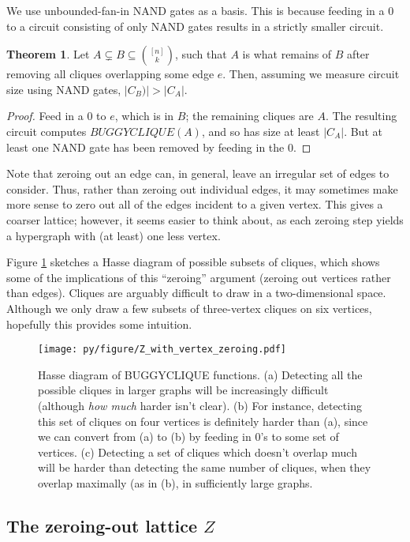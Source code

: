 \documentclass[12pt]{article}
\theoremstyle{definition}
\newtheorem{thm}{Theorem}[section]
\begin{document}
We use unbounded-fan-in NAND gates as a basis.
This is because feeding in a 0 to a circuit consisting of only NAND
gates results in a strictly smaller circuit.

\begin{thm}
\label{edgeZonking}
Let $A \subsetneq B \subseteq {[n] \choose k}$, such that $A$ is what remains
of $B$ after removing all cliques overlapping some edge $e$.
Then, assuming we measure circuit size using NAND gates,
$|C_B)| > |C_A|$.
\end{thm}
\begin{proof}
Feed in a 0 to $e$, which is in $B$; the remaining cliques are $A$.
The resulting
circuit computes $BUGGYCLIQUE(A)$, and so has size
at least $|C_A|$. But at least one
NAND gate has been removed by feeding in the 0.
\end{proof}

Note that zeroing out an edge can, in general, leave an irregular
set of edges to consider.
Thus, rather than zeroing out individual edges,
it may sometimes make more sense to zero out all of the
edges incident to a given vertex. This gives a coarser lattice; however,
it seems
easier to think about, as each zeroing step yields a hypergraph
with (at least) one less vertex.

Figure \ref{fig:Hasse}
sketches a Hasse diagram of possible subsets of cliques,
which shows some of the implications of this ``zeroing'' argument
(zeroing out vertices rather than edges).
Cliques are arguably difficult to draw in a two-dimensional space.
Although we only draw a few subsets of three-vertex cliques
on six vertices, hopefully this provides some
intuition.

\begin{figure}
\label{fig:Hasse}
\centering
\texttt{[image: py/figure/Z\_with\_vertex\_zeroing.pdf]}
\caption{Hasse diagram of BUGGYCLIQUE functions.
(a)
Detecting all the possible cliques in larger graphs will be
increasingly difficult (although {\em how much} harder isn't clear).
(b) For instance,
detecting this set of cliques on four vertices
is definitely harder than (a),
since we can convert from (a) to (b) by feeding in 0's to
some set of vertices.
(c) Detecting a set of cliques which doesn't overlap much will be
harder than detecting the same number of cliques, when they overlap
maximally (as in (b), in sufficiently large graphs.
}
\end{figure}

\subsection{The zeroing-out lattice $Z$}
\end{document}
